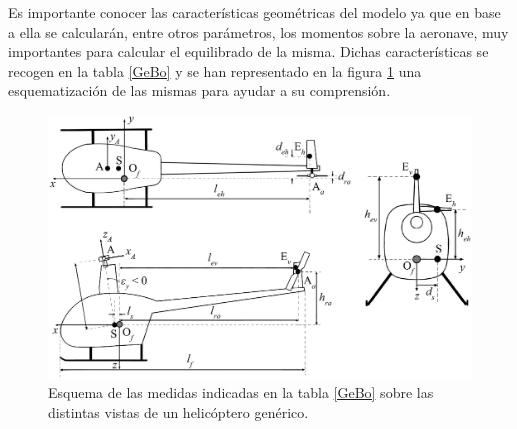 Es importante conocer las características geométricas del modelo ya que en base a ella se calcularán, entre otros parámetros, los momentos sobre la aeronave, muy importantes para calcular el equilibrado de la misma.
Dichas características se recogen en la tabla \ref{GeBo} y se han representado en la figura \ref{GeBodraw} una esquematización de las mismas para ayudar a su comprensión.

\begin{figure}
	\centering
	\includegraphics[width=120mm]{imagenes/geometria}
	\caption{Esquema de las medidas indicadas en la tabla \ref{GeBo} sobre las distintas vistas de un helicóptero genérico.}
	\label{GeBodraw}
\end{figure}

